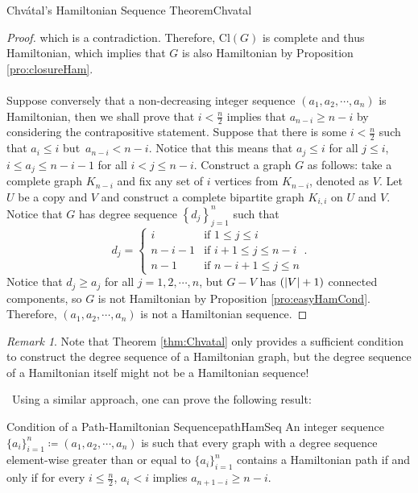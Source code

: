 \documentclass[math]{amznotes}
\theoremstyle{remark}
\newtheorem*{remark}{Remark}
\newcommand{\0}{\mathbf{0}}
\newcommand{\1}{\mathbf{1}}
\begin{document}
\begin{thmbox}{Chv\'{a}tal's Hamiltonian Sequence Theorem}{Chvatal}
\begin{proof}
        which is a contradiction. Therefore, $\mathrm{Cl}(G)$ is complete and thus Hamiltonian, which implies that $G$ is also Hamiltonian by Proposition \ref{pro:closureHam}.
        \\\\
        Suppose conversely that a non-decreasing integer sequence $(a_1, a_2, \cdots, a_n)$ is Hamiltonian, then we shall prove that $i < \frac{n}{2}$ implies that $a_{n - i} \geq n - i$ by considering the contrapositive statement. Suppose that there is some $i < \frac{n}{2}$ such that $a_i \leq i$ but~$a_{n - i} < n - i$. Notice that this means that $a_j \leq i$ for all $j \leq i$, $i \leq a_j \leq n - i - 1$ for all $i < j \leq n - i$. Construct a graph $G$ as follows: take a complete graph $K_{n - i}$ and fix any set of $i$ vertices from $K_{n - i}$, denoted as $V$. Let $U$ be a copy and $V$ and construct a complete bipartite graph $K_{i, i}$ on $U$ and $V$. Notice that $G$ has degree sequence $\left\{d_j\right\}_{j = 1}^{n}$ such that 
        \begin{equation*}
            d_j = \begin{cases}
                i & \textrm{if } 1 \leq j \leq i \\
                n - i - 1 & \textrm{if } i + 1 \leq j \leq n - i \\
                n - 1 & \textrm{if } n - i + 1 \leq j \leq n
            \end{cases}.
        \end{equation*}
        Notice that $d_j \geq a_j$ for all $j = 1, 2, \cdots, n$, but $G - V$ has $({\left\lvert {V} \right\rvert} + 1)$ connected components, so $G$ is not Hamiltonian by Proposition \ref{pro:easyHamCond}. Therefore, $(a_1, a_2, \cdots, a_n)$ is not a Hamiltonian sequence.
    \end{proof}
\end{thmbox}
\begin{notebox}
    \begin{remark}      
        Note that Theorem \ref{thm:Chvatal} only provides a sufficient condition to construct the degree sequence of a Hamiltonian graph, but the degree sequence of a Hamiltonian itself might not be a Hamiltonian sequence!  
    \end{remark}        
\end{notebox}\
Using a similar approach, one can prove the following result:
\begin{thmbox}{Condition of a Path-Hamiltonian Sequence}{pathHamSeq}
    An integer sequence $\{a_i\}_{i = 1}^n \coloneqq (a_1, a_2, \cdots, a_n)$ is such that every graph with a degree sequence element-wise greater than or equal to $\{a_i\}_{i = 1}^n$ contains a Hamiltonian path if and only if for every $i \leq \frac{n}{2}$, $a_i < i$ implies $a_{n + 1 - i} \geq n - i$.
\end{thmbox}
\end{document}
